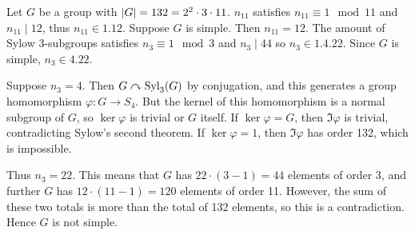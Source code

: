 \begin{example}
	Let \( G \) be a group with \( \abs{G} = 132 = 2^2 \cdot 3 \cdot 11 \).
	\( n_{11} \) satisfies \( n_{11} \equiv 1 \mod 11 \) and \( n_{11} \mid 12 \), thus \( n_{11} \in \qty{1, 12} \).
	Suppose \( G \) is simple.
	Then \( n_{11} = 12 \).
	The amount of Sylow 3-subgroups satisfies \( n_3 \equiv 1 \mod 3 \) and \( n_3 \mid 44 \) so \( n_3 \in \qty{1, 4, 22} \).
	Since \( G \) is simple, \( n_3 \in \qty{4, 22} \).

	Suppose \( n_3 = 4 \).
	Then \( G \curvearrowright \mathrm{Syl}_3(G) \) by conjugation, and this generates a group homomorphism \( \varphi \colon G \to S_4 \).
	But the kernel of this homomorphism is a normal subgroup of \( G \), so \( \ker \varphi \) is trivial or \( G \) itself.
	If \( \ker \varphi = G \), then \( \Im \varphi \) is trivial, contradicting Sylow's second theorem.
	If \( \ker \varphi = 1 \), then \( \Im \varphi \) has order 132, which is impossible.

	Thus \( n_3 = 22 \).
	This means that \( G \) has \( 22 \cdot (3-1) = 44 \) elements of order 3, and further \( G \) has \( 12 \cdot (11 - 1) = 120 \) elements of order 11.
	However, the sum of these two totals is more than the total of 132 elements, so this is a contradiction.
	Hence \( G \) is not simple.
\end{example}
